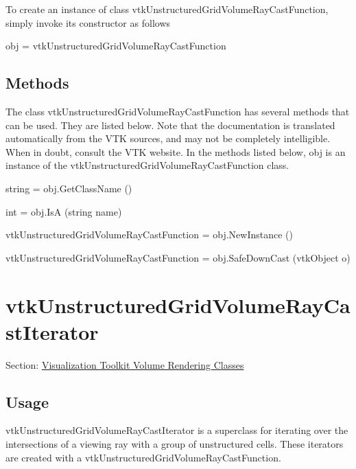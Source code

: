 To create an instance of class vtk\-Unstructured\-Grid\-Volume\-Ray\-Cast\-Function, simply invoke its constructor as follows \begin{DoxyVerb}  obj = vtkUnstructuredGridVolumeRayCastFunction
\end{DoxyVerb}
 \hypertarget{vtkwidgets_vtkxyplotwidget_Methods}{}\subsection{Methods}\label{vtkwidgets_vtkxyplotwidget_Methods}
The class vtk\-Unstructured\-Grid\-Volume\-Ray\-Cast\-Function has several methods that can be used. They are listed below. Note that the documentation is translated automatically from the V\-T\-K sources, and may not be completely intelligible. When in doubt, consult the V\-T\-K website. In the methods listed below, {\ttfamily obj} is an instance of the vtk\-Unstructured\-Grid\-Volume\-Ray\-Cast\-Function class. 
\begin{DoxyItemize}
\item {\ttfamily string = obj.\-Get\-Class\-Name ()}  
\item {\ttfamily int = obj.\-Is\-A (string name)}  
\item {\ttfamily vtk\-Unstructured\-Grid\-Volume\-Ray\-Cast\-Function = obj.\-New\-Instance ()}  
\item {\ttfamily vtk\-Unstructured\-Grid\-Volume\-Ray\-Cast\-Function = obj.\-Safe\-Down\-Cast (vtk\-Object o)}  
\end{DoxyItemize}\hypertarget{vtkvolumerendering_vtkunstructuredgridvolumeraycastiterator}{}\section{vtk\-Unstructured\-Grid\-Volume\-Ray\-Cast\-Iterator}\label{vtkvolumerendering_vtkunstructuredgridvolumeraycastiterator}
Section\-: \hyperlink{sec_vtkvolumerendering}{Visualization Toolkit Volume Rendering Classes} \hypertarget{vtkwidgets_vtkxyplotwidget_Usage}{}\subsection{Usage}\label{vtkwidgets_vtkxyplotwidget_Usage}
vtk\-Unstructured\-Grid\-Volume\-Ray\-Cast\-Iterator is a superclass for iterating over the intersections of a viewing ray with a group of unstructured cells. These iterators are created with a vtk\-Unstructured\-Grid\-Volume\-Ray\-Cast\-Function.

